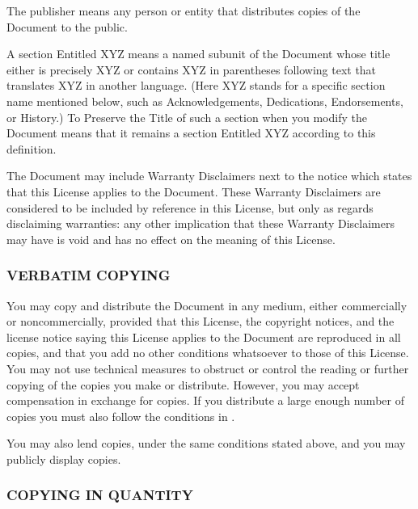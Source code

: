 \documentclass[10pt,english]{article}
\begin{document}
The \textquotedbl{}publisher\textquotedbl{} means any person or entity
that distributes copies of the Document to the public.

A section \textquotedbl{}Entitled XYZ\textquotedbl{} means a named
subunit of the Document whose title either is precisely XYZ or contains
XYZ in parentheses following text that translates XYZ in another language.
(Here XYZ stands for a specific section name mentioned below, such
as \textquotedbl{}Acknowledgements\textquotedbl{}, \textquotedbl{}Dedications\textquotedbl{},
\textquotedbl{}Endorsements\textquotedbl{}, or \textquotedbl{}History\textquotedbl{}.)
To \textquotedbl{}Preserve the Title\textquotedbl{} of such a section
when you modify the Document means that it remains a section \textquotedbl{}Entitled
XYZ\textquotedbl{} according to this definition.

The Document may include Warranty Disclaimers next to the notice which
states that this License applies to the Document. These Warranty Disclaimers
are considered to be included by reference in this License, but only
as regards disclaiming warranties: any other implication that these
Warranty Disclaimers may have is void and has no effect on the meaning
of this License.


\subsubsection{VERBATIM COPYING\label{sub:VERBATIM-COPYING}}

You may copy and distribute the Document in any medium, either commercially
or noncommercially, provided that this License, the copyright notices,
and the license notice saying this License applies to the Document
are reproduced in all copies, and that you add no other conditions
whatsoever to those of this License. You may not use technical measures
to obstruct or control the reading or further copying of the copies
you make or distribute. However, you may accept compensation in exchange
for copies. If you distribute a large enough number of copies you
must also follow the conditions in .

You may also lend copies, under the same conditions stated above,
and you may publicly display copies.


\subsubsection{COPYING IN QUANTITY\label{sub:COPYING-IN-QUANTITY}}
\end{document}
